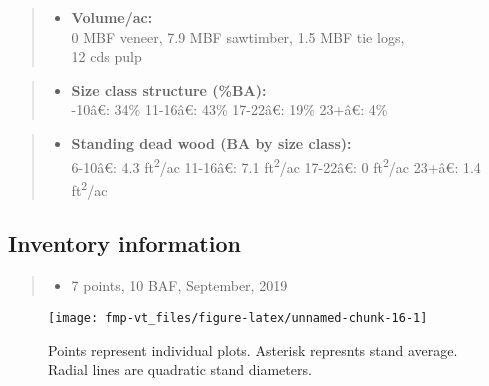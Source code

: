 \documentclass[]{tufte-handout}
\newcommand{\euro}{€}
\providecommand{\tightlist}{%
  \setlength{\itemsep}{0pt}\setlength{\parskip}{0pt}}
\begin{document}
\begin{quote}
\begin{itemize}
\tightlist
\item
  \textbf{Volume/ac:}\\
  \vspace{2pt} 0 MBF veneer, 7.9 MBF sawtimber, 1.5 MBF tie logs,\\
  12 cds pulp
\end{itemize}
\end{quote}

\begin{quote}
\begin{itemize}
\tightlist
\item
  \textbf{Size class structure (\%BA):}\\
  \vspace{2pt} -10â\euro{}: 34\% \textbar{} 11-16â\euro{}:
  43\% \textbar{} 17-22â\euro{}: 19\% \textbar{} 23+â\euro{}: 4\%
\end{itemize}
\end{quote}

\begin{quote}
\begin{itemize}
\tightlist
\item
  \textbf{Standing dead wood (BA by size class):}\\
  \vspace{2pt} 6-10â\euro{}: 4.3 ft\textsuperscript{2}/ac \textbar{}
  11-16â\euro{}: 7.1 ft\textsuperscript{2}/ac \textbar{}
  17-22â\euro{}: 0 ft\textsuperscript{2}/ac \textbar{} 23+â\euro{}:
  1.4 ft\textsuperscript{2}/ac
\end{itemize}
\end{quote}

\subsection{Inventory information}\label{inventory-information-3}

\begin{quote}
\begin{itemize}
\tightlist
\item
  7 points, 10 BAF, September, 2019
\end{itemize}
\end{quote}

\begin{figure}
\texttt{[image: fmp-vt\_files/figure-latex/unnamed-chunk-16-1]} \caption[Points represent individual plots]{Points represent individual plots. Asterisk represnts stand average. Radial lines are quadratic stand diameters.}\label{fig:unnamed-chunk-16}
\end{figure}
\end{document}
